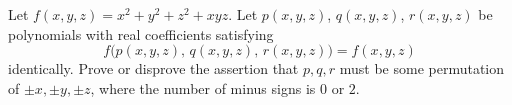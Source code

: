Let $f(x,y,z)=x^2+y^2+z^2+xyz$. Let $p(x,y,z)$, $q(x,y,z)$, $r(x,y,z)$ be polynomials with real coefficients satisfying
\[f\bigl(p(x,y,z),\,q(x,y,z),\,r(x,y,z)\bigr)=f(x,y,z)\]
identically. Prove or disprove the assertion that $p,q,r$ must be some permutation of $\pm x,\pm y,\pm z$, where the number of minus signs is $0$ or $2$.

